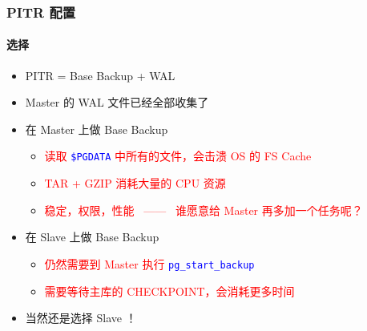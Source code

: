 \documentclass[11pt, xetex, xcolor=x11names]{beamer}
\newcommand{\keyword}[1] {{\tt\small\textcolor{blue}{#1}}}
\begin{document}
\begin{frame}
  \frametitle{PITR 配置}
  \framesubtitle{选择}
  \begin{itemize}
  \item  PITR = Base Backup + WAL
  \item  Master 的 WAL 文件已经全部收集了
  \item  在 Master 上做 Base Backup 
  \begin{itemize}
  	\item \textcolor{red}{ 读取 \keyword{\$PGDATA} 中所有的文件，会击溃 OS 的 FS Cache}
  	\item \textcolor{red}{ TAR + GZIP 消耗大量的 CPU 资源 }
  	\item \textcolor{red}{ 稳定，权限，性能~ ——~ 谁愿意给 Master 再多加一个任务呢？ }
  \end{itemize}
  \item  在 Slave 上做 Base Backup 
  \begin{itemize}
  	\item \textcolor{red}{ 仍然需要到 Master 执行 \keyword{pg\_start\_backup} }
  	\item \textcolor{red}{ 需要等待主库的 CHECKPOINT，会消耗更多时间 }
  \end{itemize}
  \item  当然还是选择 Slave ！
  \end{itemize}
\end{frame}
\end{document}
